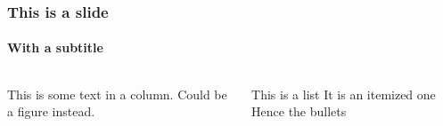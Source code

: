 \documentclass[aspectratio=169]{beamer}
\begin{document}
\begin{frame}
	\frametitle{This is a slide}
	\framesubtitle{With a subtitle}

	\begin{columns}
		\begin{column}{0.6\textwidth}
			This is some text in a column. Could be a figure instead.
		\end{column}
		\begin{column}{0.4\textwidth}
			\begin{outline}[itemize]
				\1
				This is a list
				\1
				It is an itemized one
				\1
				Hence the bullets
			\end{outline}
		\end{column}
	\end{columns}
\end{frame}


\printbibliography
\end{document}
